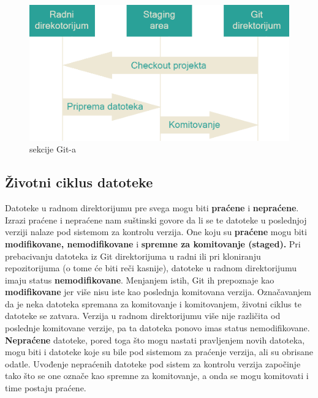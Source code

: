 \documentclass[a4paper]{article}
\begin{document}
{\begin{figure}[h!]
\begin{center}
\includegraphics[scale=0.19]{images/sekcije.png}
\end{center}
\caption{sekcije Git-a}
\label{fig:git_sekcije}
\end{figure}



\subsection{Životni ciklus datoteke}
\label{subsec:ciklus}
Datoteke u radnom direktorijumu pre svega mogu biti \textbf{praćene} i \textbf{nepraćene}. Izrazi praćene i nepraćene nam suštinski govore da li se te datoteke u poslednjoj verziji nalaze pod sistemom za kontrolu verzija.
\linebreak \indent
One koju su \textbf{praćene} mogu biti \textbf{modifikovane, nemodifikovane} i \textbf{spremne za komitovanje (staged).} Pri prebacivanju datoteka iz Git direktorijuma u radni ili pri kloniranju repozitorijuma (o tome će biti reči kasnije), datoteke u radnom direktorijumu imaju status \textbf{nemodifikovane}. Menjanjem istih, Git ih prepoznaje kao \textbf{modifikovane} jer više nisu iste kao poslednja komitovana verzija. Označavanjem da je neka datoteka spremana za komitovanje i komitovanjem, životni ciklus te datoteke se zatvara. Verzija u radnom direktorijumu više nije različita od poslednje komitovane verzije, pa ta datoteka ponovo imas status nemodifikovane.
\linebreak \indent
\textbf{Nepraćene} datoteke, pored toga što mogu nastati pravljenjem novih datoteka, mogu biti i datoteke koje su bile pod sistemom za praćenje verzija, ali su obrisane odatle. Uvođenje nepraćenih datoteke pod sistem za kontrolu verzija započinje tako što se one označe kao spremne za komitovanje, a onda se mogu komitovati i time postaju praćene.

}
\end{document}
